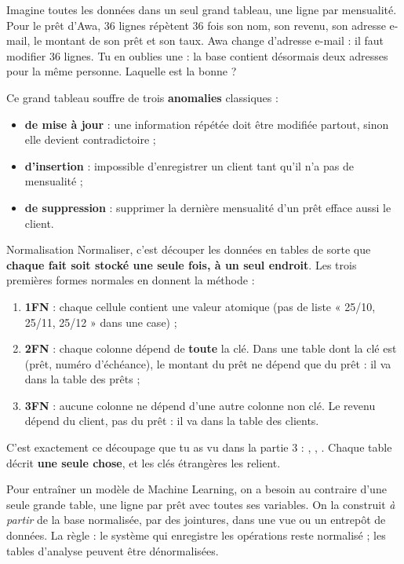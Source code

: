 \begin{imagine}
Imagine toutes les données dans un seul grand tableau, une ligne par mensualité. Pour le prêt d'Awa,
36 lignes répètent 36 fois son nom, son revenu, son adresse e-mail, le montant de son prêt et son
taux. Awa change d'adresse e-mail : il faut modifier 36 lignes. Tu en oublies une : la base contient
désormais deux adresses pour la même personne. Laquelle est la bonne ?
\end{imagine}

Ce grand tableau souffre de trois \textbf{anomalies} classiques :
\begin{itemize}
\item \textbf{de mise à jour} : une information répétée doit être modifiée partout, sinon elle devient
contradictoire ;
\item \textbf{d'insertion} : impossible d'enregistrer un client tant qu'il n'a pas de mensualité ;
\item \textbf{de suppression} : supprimer la dernière mensualité d'un prêt efface aussi le client.
\end{itemize}

\begin{definition}{Normalisation}
Normaliser, c'est découper les données en tables de sorte que \textbf{chaque fait soit stocké une seule
fois, à un seul endroit}. Les trois premières formes normales en donnent la méthode :
\begin{enumerate}
\item \textbf{1FN} : chaque cellule contient une valeur atomique (pas de liste « 25/10, 25/11, 25/12 »
dans une case) ;
\item \textbf{2FN} : chaque colonne dépend de \textbf{toute} la clé. Dans une table dont la clé est
(prêt, numéro d'échéance), le montant du prêt ne dépend que du prêt : il va dans la table des prêts ;
\item \textbf{3FN} : aucune colonne ne dépend d'une autre colonne non clé. Le revenu dépend du client,
pas du prêt : il va dans la table des clients.
\end{enumerate}
\end{definition}

C'est exactement ce découpage que tu as vu dans la partie 3 : , ,
. Chaque table décrit \textbf{une seule chose}, et les clés étrangères
les relient.

\begin{observation}
Pour entraîner un modèle de Machine Learning, on a besoin au contraire d'une seule grande table, une
ligne par prêt avec toutes ses variables. On la construit \emph{à partir} de la base normalisée, par
des jointures, dans une vue ou un entrepôt de données. La règle : le système qui enregistre les
opérations reste normalisé ; les tables d'analyse peuvent être dénormalisées.
\end{observation}

